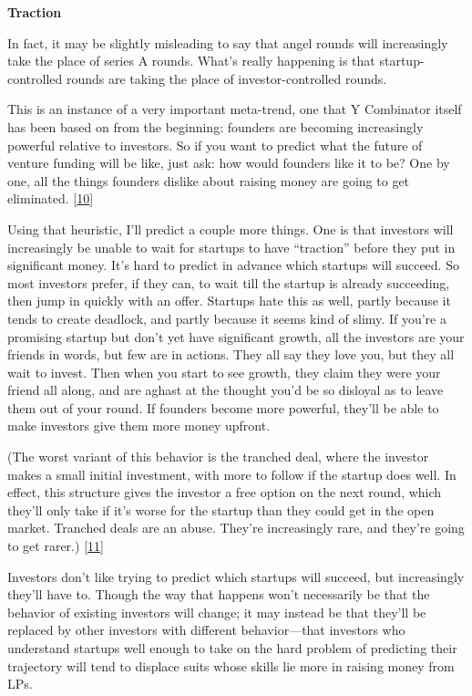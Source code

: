 \textbf{Traction}

In fact, it may be slightly misleading to say that angel rounds will
increasingly take the place of series A rounds. What's really happening
is that startup-controlled rounds are taking the place of
investor-controlled rounds.

This is an instance of a very important meta-trend, one that Y
Combinator itself has been based on from the beginning: founders are
becoming increasingly powerful relative to investors. So if you want to
predict what the future of venture funding will be like, just ask: how
would founders like it to be? One by one, all the things founders
dislike about raising money are going to get eliminated.
{[}\hyperref[f10n]{10}{]}

Using that heuristic, I'll predict a couple more things. One is that
investors will increasingly be unable to wait for startups to have
``traction'' before they put in significant money. It's hard to predict
in advance which startups will succeed. So most investors prefer, if
they can, to wait till the startup is already succeeding, then jump in
quickly with an offer. Startups hate this as well, partly because it
tends to create deadlock, and partly because it seems kind of slimy. If
you're a promising startup but don't yet have significant growth, all
the investors are your friends in words, but few are in actions. They
all say they love you, but they all wait to invest. Then when you start
to see growth, they claim they were your friend all along, and are
aghast at the thought you'd be so disloyal as to leave them out of your
round. If founders become more powerful, they'll be able to make
investors give them more money upfront.

(The worst variant of this behavior is the tranched deal, where the
investor makes a small initial investment, with more to follow if the
startup does well. In effect, this structure gives the investor a free
option on the next round, which they'll only take if it's worse for the
startup than they could get in the open market. Tranched deals are an
abuse. They're increasingly rare, and they're going to get rarer.)
{[}\hyperref[f11n]{11}{]}

Investors don't like trying to predict which startups will succeed, but
increasingly they'll have to. Though the way that happens won't
necessarily be that the behavior of existing investors will change; it
may instead be that they'll be replaced by other investors with
different behavior---that investors who understand startups well enough
to take on the hard problem of predicting their trajectory will tend to
displace suits whose skills lie more in raising money from LPs.

